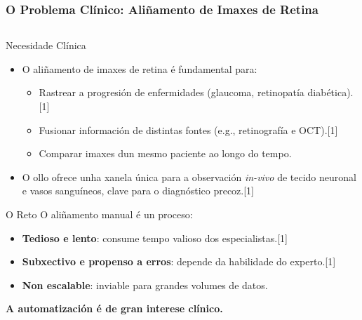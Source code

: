 \documentclass[xcolor=dvipsnames]{beamer}
\begin{document}
\begin{frame}
    \frametitle{O Problema Clínico: Aliñamento de Imaxes de Retina}
    
    \begin{columns}
        \begin{column}{0.6\textwidth}
            \begin{block}{Necesidade Clínica}
                \begin{itemize}
                    \item O aliñamento de imaxes de retina é fundamental para:
                    \begin{itemize}
                        \item Rastrear a progresión de enfermidades (glaucoma, retinopatía diabética).[1]
                        \item Fusionar información de distintas fontes (e.g., retinografía e OCT).[1]
                        \item Comparar imaxes dun mesmo paciente ao longo do tempo.
                    \end{itemize}
                    \item O ollo ofrece unha xanela única para a observación \textit{in-vivo} de tecido neuronal e vasos sanguíneos, clave para o diagnóstico precoz.[1]
                \end{itemize}
            \end{block}
            
            \begin{alertblock}{O Reto}
                O aliñamento manual é un proceso:
                \begin{itemize}
                    \item \textbf{Tedioso e lento}: consume tempo valioso dos especialistas.[1]
                    \item \textbf{Subxectivo e propenso a erros}: depende da habilidade do experto.[1]
                    \item \textbf{Non escalable}: inviable para grandes volumes de datos.
                \end{itemize}
                \vspace{0.2cm}
                \rightarrow \textbf{A automatización é de gran interese clínico.}
            \end{alertblock}
        \end{column}
        

\end{columns}
\end{frame}
\end{document}
